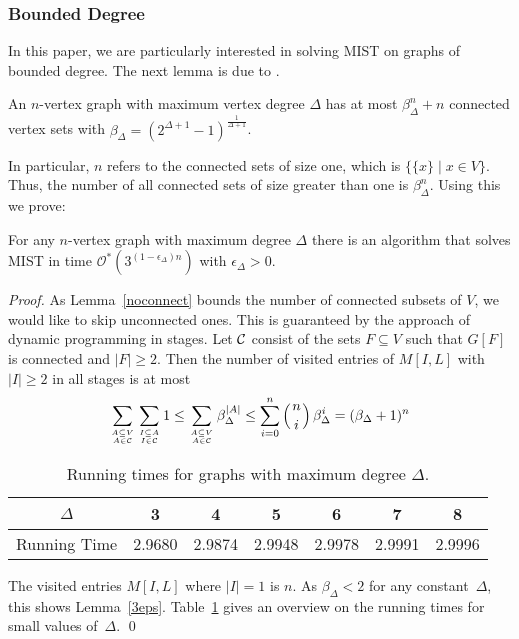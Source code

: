 \documentclass{llncs}
\newcommand{\longversion}[1]{#1}
\newcommand{\mc}{\mathcal}
\newcommand{\Oh}{{\mc{O}}}
\begin{document}
\subsubsection{Bounded Degree}
In this paper, we are particularly interested in solving MIST on graphs of bounded degree. The next lemma is due to \cite{BjoHusKasKoi08}.
\begin{lemma}\label{noconnect}
An $n$-vertex graph with maximum vertex degree $\Delta$ has at most $\beta_\Delta^n+n$ connected vertex sets with $\beta_\Delta=(2^{\Delta+1}-1)^{\frac{1}{\Delta+1}} $.
\end{lemma}
In particular, $n$ refers to the connected sets of size one, which is $\{\{x\}\mid x\in V\}$. 
Thus, the number of all connected sets of size greater than one is $\beta_\Delta^n$.  
Using this we prove: \begin{lemma}\label{3eps}
For any $n$-vertex graph with maximum degree $\Delta$ there is an algorithm that solves MIST in time $\Oh^*(3^{(1-\epsilon_\Delta)n})$ with $\epsilon_\Delta >0$.
\end{lemma}

\begin{proof}
As Lemma~\ref{noconnect} bounds the number of connected subsets of $V$, we would like to skip unconnected ones. This is guaranteed by the approach of dynamic programming in stages.
Let $\cal C$ consist of the sets $F \subseteq V$ such that $G[F]$ is connected and $|F|\ge2$. Then the number of visited entries of $M[I,L]$ with $|I|\ge 2$ in all stages is at most
\begin{equation*}
\sum_{A \subseteq V \atop A \in {\cal C}}\sum_{I \subseteq A \atop I \in {\cal C}} 1\le \sum_{A \subseteq V \atop A \in {\cal C}} \beta_\Delta^{|A|} \le \sum_{i=0}^n \left(n \atop i\right) \beta_\Delta^i =(\beta_\Delta+1)^n
\end{equation*}

\begin{table}[tb]\centering
\begin{tabular}{c c c c c c c}\hline
$\Delta$ & 3 & 4 & 5 & 6 & 7 & 8 \\ \hline
Running Time & 2.9680 & 2.9874 & 2.9948 & 2.9978 & 2.9991 & 2.9996\\ \hline
\end{tabular}
\caption{\label{tab1}Running times for graphs with maximum degree  $\Delta$.}
\end{table}

The visited entries $M[I,L]$ where $|I|=1$ is $n$. As $\beta_\Delta<2$ for any\longversion{ constant}~$\Delta$, this shows Lemma~\ref{3eps}. Table~\ref{tab1} gives an overview on the running times for small\longversion{ values of}~$\Delta$.
\qed
\end{proof}
\end{document}
